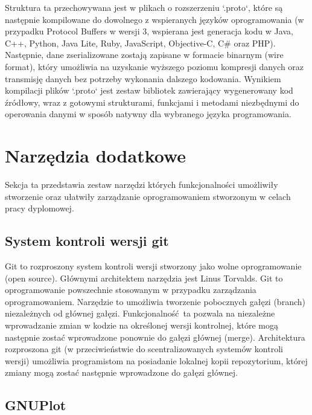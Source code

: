 \documentclass[a4paper,12pt,twoside,openany]{report}
\begin{document}
Struktura ta przechowywana jest w plikach o rozszerzeniu `.proto`, które są następnie kompilowane do dowolnego z wspieranych języków oprogramowania 
(w przypadku Protocol Buffers w wersji 3, wspierana jest generacja kodu w Java, C++, Python, Java Lite, Ruby, JavaScript, Objective-C, C\# oraz PHP).
Następnie, dane zserializowane zostają zapisane w formacie binarnym (wire format), który umożliwia na uzyskanie wyższego poziomu kompresji danych oraz transmisję danych 
bez potrzeby wykonania dalszego kodowania. 
Wynikiem kompilacji plików `.proto` jest zestaw bibliotek zawierający wygenerowany kod źródłowy, wraz z gotowymi strukturami, funkcjami i metodami niezbędnymi do 
operowania danymi w sposób natywny dla wybranego języka programowania.

\section{Narzędzia dodatkowe}

Sekcja ta przedstawia zestaw narzędzi których funkcjonalności umożliwiły stworzenie oraz ułatwiły zarządzanie oprogramowaniem stworzonym w celach
pracy dyplomowej. 

\subsection{System kontroli wersji git}
Git to rozproszony system kontroli wersji stworzony jako wolne oprogramowanie (open source). 
Głównymi architektem narzędzia jest Linus Torvalds. Git to oprogramowanie powszechnie stosowanym w przypadku zarządzania oprogramowaniem.
Narzędzie to umożliwia tworzenie pobocznych gałęzi (branch) niezależnych od głównej gałęzi. Funkcjonalność ta pozwala na niezależne wprowadzanie zmian
w kodzie na określonej wersji kontrolnej, które mogą następnie zostać wprowadzone ponownie do gałęzi głównej (merge).
Architektura rozproszona git (w przeciwieństwie do scentralizowanych systemów kontroli wersji) umożliwia programistom na posiadanie lokalnej kopii repozytorium,
której zmiany mogą zostać następnie wprowadzone do gałęzi głównej.

\subsection{GNUPlot}
\end{document}
